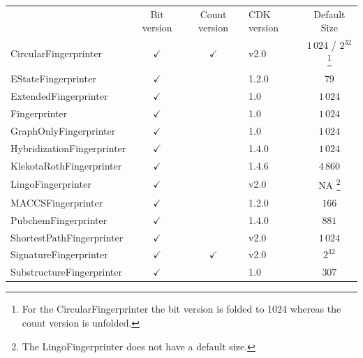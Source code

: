 \documentclass[10pt]{bmcart}
\def \cdkversion {v2.0}
\begin{document}
\begin{backmatter}
    \begin{minipage}{1\textwidth}
    \renewcommand*{\thempfootnote}{\fnsymbol{mpfootnote}}
    \centering
    \begin{tabular}{lcclc}
                             & Bit version  & Count version & CDK version & Default Size    \\
  CircularFingerprinter~\cite{rogers2010extended, Clark2014}      & $\checkmark$ & $\checkmark$  & \cdkversion{}     & $1\,024$ / $2^{32}$%
\footnote[1]{For the CircularFingerprinter the bit version is folded to 1024 whereas the count version is unfolded.} \\
  EStateFingerprinter~\cite{Hall1995}       & $\checkmark$ &               & 1.2.0       & $79$            \\
  ExtendedFingerprinter      & $\checkmark$ &               & 1.0         & $1\,024$        \\
  Fingerprinter              & $\checkmark$ &               & 1.0         & $1\,024$        \\
  GraphOnlyFingerprinter     & $\checkmark$ &               & 1.0         & $1\,024$        \\
  HybridizationFingerprinter & $\checkmark$ &               & 1.4.0       & $1\,024$        \\
  KlekotaRothFingerprinter~\cite{Klekota2008}   & $\checkmark$ &               & 1.4.6       & $4\,860$        \\
  LingoFingerprinter~\cite{vidal2005lingo}         & $\checkmark$ &               & \cdkversion{}     & NA%
\footnote[2]{The LingoFingerprinter does not have a default size.}
                                                                                             \\
  MACCSFingerprinter         & $\checkmark$ &               & 1.2.0       & $166$           \\
  PubchemFingerprinter~\cite{pubchemFP}       & $\checkmark$ &               & 1.4.0       & $881$            \\
  ShortestPathFingerprinter  & $\checkmark$ &               & \cdkversion{}     & $1\,024$        \\
  SignatureFingerprinter~\cite{signaturefingerprints}     & $\checkmark$ & $\checkmark$  & \cdkversion{}     & $2^{32}$         \\
  SubstructureFingerprinter  & $\checkmark$ &               & 1.0         & $307$           \\

    \end{tabular}
    \end{minipage}


\end{backmatter}
\end{document}
